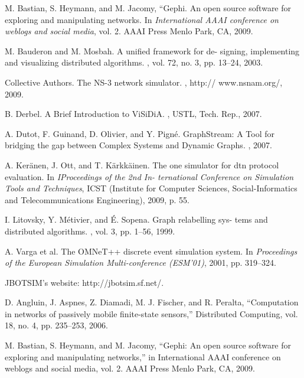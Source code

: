 \begin{thebibliography}{1}
	M. Bastian, S. Heymann, and M. Jacomy, “Gephi.
	\newblock An open source software for exploring and manipulating networks.
	\newblock In {\em International AAAI conference on weblogs and social media}, vol. 2. AAAI Press Menlo Park, CA, 2009.
	
	M. Bauderon and M. Mosbah.
	\newblock A unified framework for de- signing, implementing and visualizing distributed algorithms.
	, vol. 72, no. 3, pp. 13–24, 2003.
	
	Collective Authors.
	\newblock The NS-3 network simulator.
	\newblock , http:// www.nsnam.org/, 2009.
	
	B. Derbel.
	\newblock A Brief Introduction to ViSiDiA.
	\newblock , USTL, Tech. Rep., 2007.
	
	A. Dutot, F. Guinand, D. Olivier, and Y. Pigné.
	\newblock GraphStream: A Tool for bridging the gap between Complex Systems and Dynamic Graphs.
	, 2007.
	
	A. Keränen, J. Ott, and T. Kärkkäinen.
	\newblock The one simulator for dtn protocol evaluation.
	\newblock In {\em IProceedings of the 2nd In- ternational Conference on Simulation Tools and Techniques}, ICST (Institute for Computer Sciences, Social-Informatics and Telecommunications Engineering), 2009, p. 55.

	I. Litovsky, Y. Métivier, and É. Sopena.
	\newblock Graph relabelling sys- tems and distributed algorithms.
	, vol. 3, pp. 1–56, 1999.

	A. Varga et al.
	\newblock The OMNeT++ discrete event simulation system.
	\newblock In {\em  Proceedings of the European Simulation Multi-conference (ESM’01)}, 2001, pp. 319–324.
	
	JBOTSIM’s website: http://jbotsim.sf.net/. 
	
	D. Angluin, J. Aspnes, Z. Diamadi, M. J. Fischer, and R. Peralta, “Computation in networks of passively mobile finite-state sensors,” Distributed Computing, vol. 18, no. 4, pp. 235–253, 2006.
	
	M. Bastian, S. Heymann, and M. Jacomy, “Gephi: An open source software for exploring and manipulating networks,” in International AAAI conference on weblogs and social media, vol. 2. AAAI Press Menlo Park, CA, 2009.
	

\end{thebibliography}
